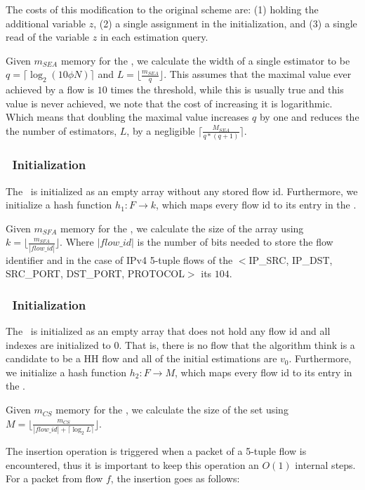 The costs of this modification to the original scheme are: (1) holding the additional variable $z$, (2) a single assignment in the initialization, and (3) a single read of the variable $z$ in each estimation query.

Given $m_{SEA}$ memory for the \sea, we calculate the width of a single estimator to be $q=\lceil \log_{2}(10 \phi N)\rceil$ and $L=\lfloor \frac{m_{SEA}}{q} \rfloor$. This assumes that the maximal value ever achieved by a flow is $10$ times the threshold, while this is usually true and this value is never achieved, we note that the cost of increasing it is logarithmic. Which means that doubling the maximal value increases $q$ by one and reduces the the number of estimators, $L$, by a negligible $\lceil\frac{M_{SEA}}{q*(q+1)}\rceil$.


\subsubsection{\sfa\ Initialization}
The \sfa\ is initialized as an empty array without any stored flow id. Furthermore, we initialize a hash function $h_1:F\rightarrow k$, which maps every flow id to its entry in the \sfa.

Given $m_{SFA}$ memory for the \sfa, we calculate the size of the array using $k=\lfloor \frac{m_{SFA}}{|flow\_id|} \rfloor$. Where $|flow\_id|$ is the number of bits needed to store the flow identifier and in the case of IPv4 5-tuple flows of the $<$IP\_SRC, IP\_DST, SRC\_PORT, DST\_PORT, PROTOCOL$>$ its $104$.

\subsubsection{\cs\ Initialization}
The \cs\ is initialized as an empty array that does not hold any flow id and all indexes are initialized to 0. That is, there is no flow that the algorithm think is a candidate to be a HH flow and all of the initial estimations are $v_0$. Furthermore, we initialize a hash function $h_2:F\rightarrow M$, which maps every flow id to its entry in the \cs.

Given $m_{CS}$ memory for the \cs, we calculate the size of the set using $M=\lfloor \frac{m_{CS}}{|flow\_id| + \lceil \log_2{L} \rceil} \rfloor$.

The insertion operation is triggered when a packet of a 5-tuple flow is encountered, thus it is important to keep this operation an $O(1)$ internal steps. For a packet from flow $f$, the insertion goes as follows:

